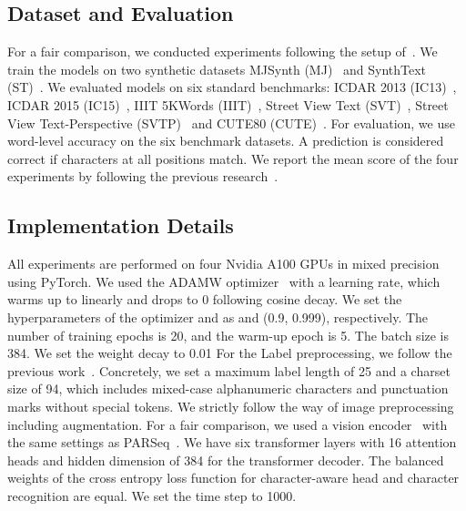 \documentclass{article}
\begin{document}
\subsection{Dataset and Evaluation}
For a fair comparison, we conducted experiments following the setup of~\cite{yu2020srn}.
We train the models on two synthetic datasets MJSynth (MJ)~\cite{jaderberg2014MJSynth, jaderberg2016MJSynth} and SynthText (ST)~\cite{gupta2016synthtext}.
We evaluated models on six standard benchmarks: ICDAR 2013 (IC13)~\cite{karatzas2013icdar}, ICDAR 2015 (IC15)~\cite{karatzas2015icdar}, IIIT 5KWords (IIIT)~\cite{mishra2012iiit}, Street View Text (SVT)~\cite{wang2011svt}, Street View Text-Perspective (SVTP)~\cite{phan2013svtp} and CUTE80 (CUTE)~\cite{risnumawan2014cute80}.
For evaluation, we use word-level accuracy on the six benchmark datasets.
A prediction is considered correct if characters at all positions match.
We report the mean score of the four experiments by following the previous research~\cite{bautista2022parseq}.


\subsection{Implementation Details}
All experiments are performed on four Nvidia A100 GPUs in mixed precision using PyTorch.
We used the ADAMW optimizer~\cite{loshchilov2018adamw} with a learning rate, which warms up to  linearly and drops to 0 following cosine decay.
We set the hyperparameters of the optimizer  and  as  and (0.9, 0.999), respectively.
The number of training epochs is 20, and the warm-up epoch is 5.
The batch size is 384.
We set the weight decay to 0.01
For the Label preprocessing, we follow the previous work~\cite{shi2018aster}. Concretely, we set a maximum label length of 25 and a charset size of 94, which includes mixed-case alphanumeric characters and punctuation marks without special tokens.
We strictly follow the way of image preprocessing~\cite{bautista2022parseq} including augmentation.
For a fair comparison, we used a vision encoder~\cite{dosovitskiy2020vit} with the same settings as PARSeq~\cite{bautista2022parseq}.
We have six transformer layers with 16 attention heads and hidden dimension  of 384 for the transformer decoder.
The balanced weights of the cross entropy loss function for character-aware head and character recognition are equal.
We set the time step  to 1000.
\end{document}
